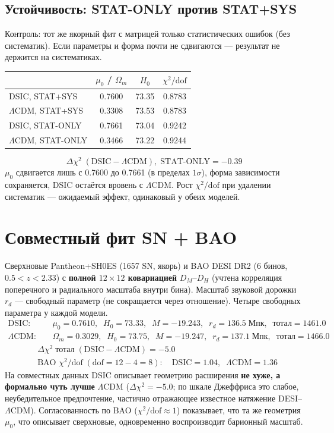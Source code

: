 \documentclass{article}
\begin{document}
\subsection{Устойчивость: STAT-ONLY против STAT+SYS}

Контроль: тот же якорный фит с матрицей только статистических ошибок (без систематик). Если параметры и форма почти не сдвигаются --- результат не держится на систематиках.

\begin{center}
\small
\begin{tabular}{@{}lccc@{}}
\toprule
& $\mu_0$ / $\Omega_m$ & $H_0$ & $\chi^2/\text{dof}$ \\
\midrule
DSIC, STAT+SYS & 0.7600 & 73.35 & 0.8783 \\
$\Lambda$CDM, STAT+SYS & 0.3308 & 73.53 & 0.8783 \\
DSIC, STAT-ONLY & 0.7661 & 73.04 & 0.9242 \\
$\Lambda$CDM, STAT-ONLY & 0.3466 & 73.22 & 0.9244 \\
\bottomrule
\end{tabular}
\end{center}
\begin{equation*}
\Delta\chi^2\;(\text{DSIC} - \Lambda\text{CDM}),\;\text{STAT-ONLY} = -0.39
\end{equation*}
$\mu_0$ сдвигается лишь с 0.7600 до 0.7661 (в пределах $1\sigma$), форма зависимости сохраняется, DSIC остаётся вровень с $\Lambda$CDM. Рост $\chi^2/\text{dof}$ при удалении систематик --- ожидаемый эффект, одинаковый у обеих моделей.
\section{Совместный фит SN + BAO}

Сверхновые Pantheon+SH0ES (1657 SN, якорь) и BAO DESI DR2 (6 бинов, $0.5 < z < 2.33$) с \textbf{полной $12{\times}12$ ковариацией} $D_M$--$D_H$ (учтена корреляция поперечного и радиального масштаба внутри бина). Масштаб звуковой дорожки $r_d$ --- свободный параметр (не сокращается через отношение). Четыре свободных параметра у каждой модели.
\begin{align*}
\text{DSIC}: &\quad \mu_0 = 0.7610,\;\; H_0 = 73.33,\;\; M = -19.243,\;\; r_d = 136.5\;\text{Мпк},\;\; \text{тотал} = 1461.0 \\
\Lambda\text{CDM}: &\quad \Omega_m = 0.3029,\;\; H_0 = 73.75,\;\; M = -19.247,\;\; r_d = 137.1\;\text{Мпк},\;\; \text{тотал} = 1466.0
\end{align*}
\begin{align*}
&\Delta\chi^2\;\text{тотал}\;(\text{DSIC} - \Lambda\text{CDM}) = -5.0 \\
&\text{BAO } \chi^2/\text{dof}\;(\text{dof} = 12-4 = 8):\quad \text{DSIC} = 1.04,\;\; \Lambda\text{CDM} = 1.36
\end{align*}
На совместных данных DSIC описывает геометрию расширения \textbf{не хуже, а формально чуть лучше} $\Lambda$CDM ($\Delta\chi^2 = -5.0$; по шкале Джеффриса это слабое, неубедительное предпочтение, частично отражающее известное натяжение DESI--$\Lambda$CDM). Согласованность по BAO ($\chi^2/\text{dof} \approx 1$) показывает, что та же геометрия $\mu_0$, что описывает сверхновые, одновременно воспроизводит барионный масштаб.
\end{document}
